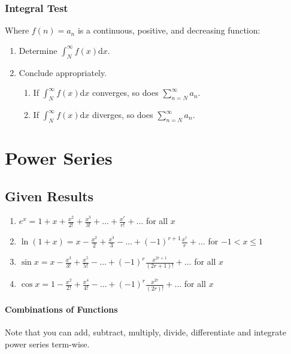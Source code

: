 \documentclass[10pt,twoside,twocolumn]{article}
\begin{document}
\subsubsection{Integral Test}

Where $f\left(n\right)=a_{n}$ is a continuous, positive, and decreasing
function: 
\begin{enumerate}
\item Determine $\int_{N}^{\infty}f\left(x\right)\text{d}x$. 
\item Conclude appropriately.

\begin{enumerate}
\item If $\int_{N}^{\infty}f\left(x\right)\text{d}x$ converges, so does
$\sum_{n=N}^{\infty}a_{n}$. 
\item If $\int_{N}^{\infty}f\left(x\right)\text{d}x$ diverges, so does
$\sum_{n=N}^{\infty}a_{n}$. 
\end{enumerate}
\end{enumerate}

\section{Power Series}


\subsection{Given Results}
\begin{enumerate}
\item $e^{x}=1+x+\frac{x^{2}}{2!}+\frac{x^{3}}{3!}+\dots+\frac{x^{r}}{r!}+\dots$
for all $x$ 
\item $\ln\left(1+x\right)=x-\frac{x^{2}}{2}+\frac{x^{3}}{3}-\dots+\left(-1\right)^{r+1}\frac{x^{r}}{r}+\dots$
for $-1<x\leq1$ 
\item $\sin x=x-\frac{x^{3}}{3!}+\frac{x^{5}}{5!}-\dots+\left(-1\right)^{r}\frac{x^{2r+1}}{\left(2r+1\right)!}+\dots$
for all $x$ 
\item $\cos x=1-\frac{x^{2}}{2!}+\frac{x^{4}}{4!}-\dots+\left(-1\right)^{r}\frac{x^{2r}}{\left(2r\right)!}+\dots$
for all $x$ 
\end{enumerate}

\paragraph{Combinations of Functions}

Note that you can add, subtract, multiply, divide, differentiate and
integrate power series term-wise.
\end{document}
